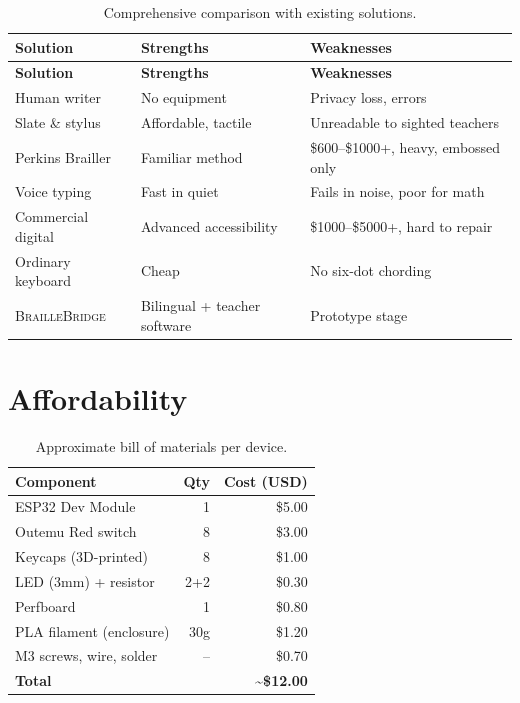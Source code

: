 \documentclass[11pt,a4paper,twoside]{article}
\newcommand{\projectname}{\textsc{BrailleBridge}}
\begin{document}
\begin{longtable}{p{2.5cm} p{3.5cm} p{5.5cm}}
\caption{Comprehensive comparison with existing solutions.}\label{tab:comprehensive}\\\toprule
\textbf{Solution} & \textbf{Strengths} & \textbf{Weaknesses} \\\midrule
\endfirsthead
\toprule\textbf{Solution} & \textbf{Strengths} & \textbf{Weaknesses}\\\midrule
\endhead
\bottomrule\endfoot
Human writer & No equipment & Privacy loss, errors \\
Slate \& stylus & Affordable, tactile & Unreadable to sighted teachers \\
Perkins Brailler & Familiar method & \$600--\$1000+, heavy, embossed only \\
Voice typing & Fast in quiet & Fails in noise, poor for math \\
Commercial digital & Advanced accessibility & \$1000--\$5000+, hard to repair \\
Ordinary keyboard & Cheap & No six-dot chording \\
\rowcolor{lineshade}\projectname{} & Bilingual + teacher software & Prototype stage \\
\end{longtable}

\section{Affordability}

\begin{table}[H]\centering
\caption{Approximate bill of materials per device.}\label{tab:bom}
\begin{tabular}{l r r}\toprule
\textbf{Component} & \textbf{Qty} & \textbf{Cost (USD)} \\\midrule
ESP32 Dev Module & 1 & \$5.00 \\
Outemu Red switch & 8 & \$3.00 \\
Keycaps (3D-printed) & 8 & \$1.00 \\
LED (3mm) + resistor & 2+2 & \$0.30 \\
Perfboard & 1 & \$0.80 \\
PLA filament (enclosure) & 30g & \$1.20 \\
M3 screws, wire, solder & -- & \$0.70 \\
\midrule\textbf{Total} & & \textbf{\textasciitilde{}\$12.00} \\\bottomrule
\end{tabular}\end{table}
\end{document}
